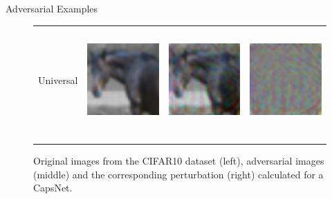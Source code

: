 \documentclass[final]{beamer}
\newlength{\onecolwid}
\newlength{\twocolwid}
\begin{document}
\begin{frame}[t]
\begin{columns}[t]
\begin{column}{\twocolwid}
\begin{columns}[t,totalwidth=\twocolwid]
\begin{column}{\onecolwid}
\begin{block}{Adversarial Examples}
\begin{figure}[h]
\begin{tabular}{rlll}
								Universal & \includegraphics[height=4cm, align=c]{../figures/universal_orig.pdf} & \includegraphics[height=4cm, align=c]{../figures/universal_adversarial.pdf} & \includegraphics[height=4cm, align=c]{../figures/universal_diff.pdf}\\
								\\
								\vspace{0.1cm}\\
							\end{tabular}
							\caption{Original images from the CIFAR10 dataset (left), adversarial images (middle) and the corresponding perturbation (right) calculated for a CapsNet.\label{tab:images}}
						\end{figure}
					\end{block}
					
					
				\end{column} %
				
			\end{columns} %
			
			
			
			

\end{column}
\end{columns}
\end{frame}
\end{document}
